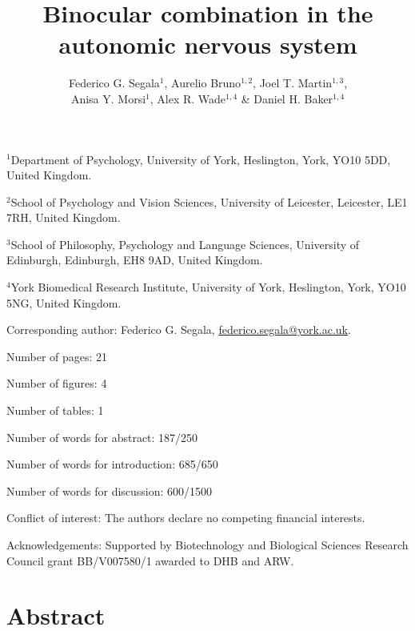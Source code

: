 \documentclass[
]{article}
\title{Binocular combination in the autonomic nervous system}
\author{Federico G. Segala\(^1\), Aurelio Bruno\(^{1,2}\), Joel T. Martin\(^{1,3}\),\\
Anisa Y. Morsi\(^1\), Alex R. Wade\(^{1,4}\) \& Daniel H. Baker\(^{1,4}\)}
\date{}
\begin{document}
\maketitle

\(^1\)Department of Psychology, University of York, Heslington, York, YO10 5DD, United Kingdom.

\(^2\)School of Psychology and Vision Sciences, University of Leicester, Leicester, LE1 7RH, United Kingdom.

\(^3\)School of Philosophy, Psychology and Language Sciences, University of Edinburgh, Edinburgh, EH8 9AD, United Kingdom.

\(^4\)York Biomedical Research Institute, University of York, Heslington, York, YO10 5NG, United Kingdom.

Corresponding author: Federico G. Segala, \url{federico.segala@york.ac.uk}.

Number of pages: 21

Number of figures: 4

Number of tables: 1

Number of words for abstract: 187/250

Number of words for introduction: 685/650

Number of words for discussion: 600/1500

Conflict of interest: The authors declare no competing financial interests.

Acknowledgements: Supported by Biotechnology and Biological Sciences Research Council grant BB/V007580/1 awarded to DHB and ARW.

\pagebreak

\section{Abstract}\label{abstract}
\end{document}
